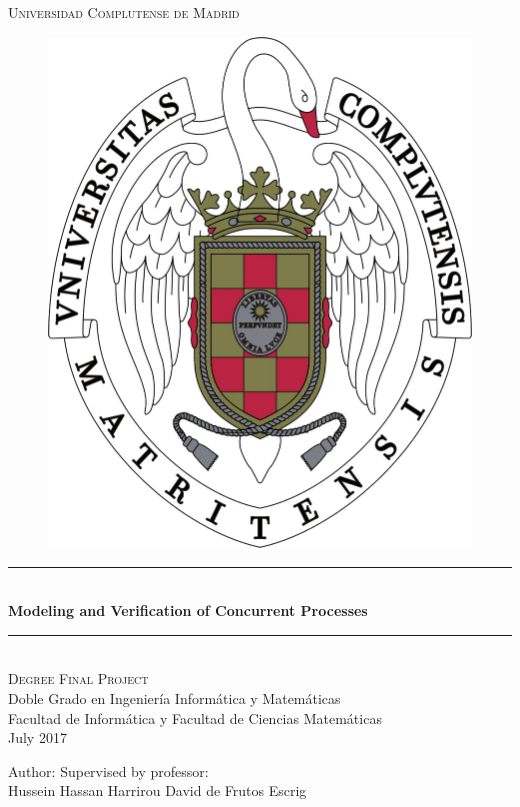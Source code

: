 \documentclass[11pt]{article}
\theoremstyle{definition}
\theoremstyle{plain}
\theoremstyle{definition}
\newcommand{\HRule}{\rule{\linewidth}{0.5mm}}	%
\begin{document}
\begin{titlepage}

\begin{center}

\textsc{\LARGE Universidad Complutense de Madrid}\\[1 cm]

\begin{figure}[h!]
	\centering
        \includegraphics[scale=0.1]{escudo} 
\end{figure}

\HRule \\[0.4cm]
{ \Huge \bfseries Modeling and Verification of Concurrent Processes }
\HRule \\[1.5 cm]

\textsc{\large Degree Final Project}\\

\large Doble Grado en Ingeniería Informática y Matemáticas \\

\large Facultad de Informática y Facultad de Ciencias Matemáticas\\
{July 2017}\\[6.5cm]

\end{center}


\begin{flushright}

\Large Author: 				\hfill 	\hfill \Large Supervised by professor:\\[8pt]
	
{\sf Hussein Hassan Harrirou 	\hfill  \hfill David de Frutos Escrig}\\

\end{flushright}

\end{titlepage}
\end{document}
